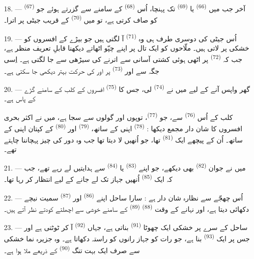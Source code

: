 18. --- آخر جب میں  \textsuperscript{(66)} یا
 \textsuperscript{(69)} تک پہنچا، اُس  \textsuperscript{(68)} کے سامنے سے گزرتے ہوئے جو
 \textsuperscript{(67)} کو صاف کرتی ہے، تو میں
 \textsuperscript{(70)} کے قریب جیٹی پر اترا۔

19. --- اُس جیٹی کی دوسری طرف ہی وہ 
\textsuperscript{(71)} آ لگتی ہیں جو بیڑے کے افسروں کو خشکی پر لاتی
ہیں۔ ملّاحوں کو ایک تال پر اپنے چپّو اٹھاتے دیکھنا قابلِ تعریف منظر
ہے، جب کہ  \textsuperscript{(72)} پر اٹھی ہوئی کشتی آسانی
سے اترنے کی سیڑھی سے جا لگتی ہے۔ اِسی جگہ سے  اور
 \textsuperscript{(73)} پر  اور 
کی حرکت بہتر دیکھی جا سکتی ہے۔

\VUsaut{3.0mm}
\VUsaut{3.0mm}

20. --- گھر واپس آنے کے لیے میں نے 
\textsuperscript{(74)} لی، جس کا  \textsuperscript{(75)}
افسروں کے کلب کے سامنے گڑے  کے پاس ہے۔

کلب کے اُس  \textsuperscript{(76)} سے، جو 
\textsuperscript{(77)}، توپوں اور گولوں سے سجا ہے، میں نے اکثر بحری
افسروں کا شان دار مجمع دیکھا : 
\textsuperscript{(78)} اپنی  کے ساتھ،
 \textsuperscript{(79)} اور 
\textsuperscript{(80)} کے کپتان اپنی  کے ساتھ۔ اُن کے
پیچھے ایک  \textsuperscript{(81)} تھا، جو اُنھیں
 لا دیتا تھا جب وہ دور کی چیز پہچاننا چاہتے تھے۔

21. --- میں نے جوان  \textsuperscript{(82)} بھی
دیکھے، جو اپنے  \textsuperscript{(83)} یا
 \textsuperscript{(84)} سے ہدایتیں لے رہے تھے، جب کہ
ایک  \textsuperscript{(85)} اُنھیں جہاز تک لے
جانے کے لیے انتظار کر رہا تھا۔

22. --- اُس چھجّے سے نظارہ شان دار ہے : سارا ساحل اپنے
 \textsuperscript{(86)} اور 
\textsuperscript{(87)} سمیت نیچے دکھائی دیتا ہے، اور نہانے کے وقت
 \textsuperscript{(88)} 
\textsuperscript{(89)} کے سامنے خوشی سے اچھلتے کودتے نظر آتے ہیں۔

23. --- ساحل کے سرے پر خشکی ایک چھوٹا 
 \textsuperscript{(91)} بناتی ہے، جہاں 
\textsuperscript{(92)} آ کر ٹوٹتی ہے اور جس پر ایک  \textsuperscript{(93)} بنا ہے، جو رات کو جہاز رانوں کو راستہ
دکھاتا ہے۔ وہ جزیرہ نما خشکی سے صرف ایک بہت تنگ 
\textsuperscript{(90)} کے ذریعے ملا ہوا ہے۔

